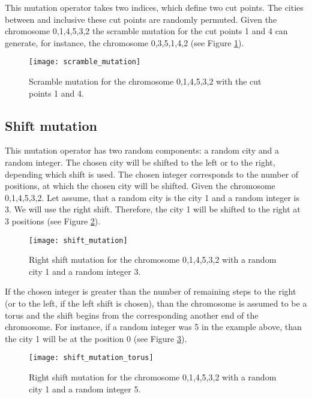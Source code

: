 \documentclass[a4paper, 12pt, headings=standardclasses]{scrartcl}
\begin{document}
This mutation operator \cite{potvin1996genetic} takes two indices, which define two cut points. The cities between and inclusive these cut points are randomly permuted. Given the chromosome 0,1,4,5,3,2 the scramble mutation for the cut points 1 and 4 can generate, for instance, the chromosome 0,3,5,1,4,2 (see Figure \ref{scramble_mutation}).

\begin{figure}[!ht]
	\centering
	\texttt{[image: scramble\_mutation]}
	\caption{Scramble mutation for the chromosome 0,1,4,5,3,2 with the cut points 1 and 4.}
	\label{scramble_mutation}
\end{figure}

\subsection{Shift mutation}

This mutation operator has two random components: a random city and a random integer. The chosen city will be shifted to the left or to the right, depending which shift is used. The chosen integer corresponds to the number of positions, at which the chosen city will be shifted. Given the chromosome 0,1,4,5,3,2. Let assume, that a random city is the city 1 and a random integer is 3. We will use the right shift. Therefore, the city 1 will be shifted to the right at 3 positions (see Figure \ref{shift_mutation}).

\begin{figure}[!ht]
	\centering
	\texttt{[image: shift\_mutation]}
	\caption{Right shift mutation for the chromosome 0,1,4,5,3,2 with a random city 1 and a random integer 3.}
	\label{shift_mutation}
\end{figure}

If the chosen integer is greater than the number of remaining steps to the right (or to the left, if the left shift is chosen), than the chromosome is assumed to be a torus and the shift begins from the corresponding another end of the chromosome. For instance, if a random integer was 5 in the example above, than the city 1 will be at the position 0 (see Figure \ref{shift_mutation_torus}).

\begin{figure}[!ht]
	\centering
	\texttt{[image: shift\_mutation\_torus]}
	\caption{Right shift mutation for the chromosome 0,1,4,5,3,2 with a random city 1 and a random integer 5.}
	\label{shift_mutation_torus}
\end{figure}
\end{document}
